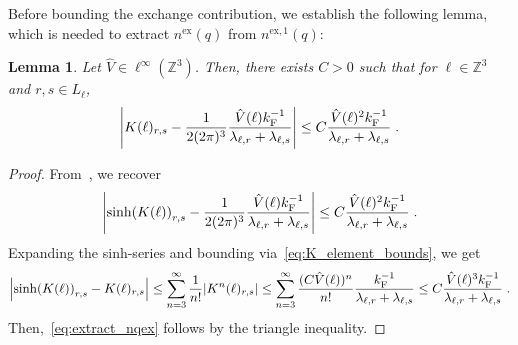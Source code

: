 \documentclass[12pt,a4paper]{article}
\numberwithin{equation}{section}
\newcommand{\1}{\mathbb{I}}
\newcommand{\ex}{\mathrm{ex}}
\newcommand{\F}{\mathrm{F}}
\newcommand{\Zstar}{\mathbb{Z}^3} %
\newcommand{\Z}{\mathbb{Z}}
\theoremstyle{plain}
\newtheorem{lemma}[theorem]{Lemma}
\theoremstyle{definition}
\theoremstyle{remark}
\theoremstyle{plain}
\theoremstyle{definition}
\theoremstyle{remark}
\begin{document}
Before bounding the exchange contribution, we establish the following lemma, which is needed to extract $ n^{\ex}(q) $ from $ n^{\ex,1}(q) $:
\begin{lemma} \label{lem:extract_nqex}
Let $ \hat{V} \in \ell^\infty(\Zstar) $. Then, there exists $ C > 0 $ such that for $ \ell \in \Zstar $ and $ r,s \in L_\ell $,
\begin{equation} \label{eq:extract_nqex}
	\abs{K(\ell)_{r,s} - \frac{1}{2 (2 \pi)^3} \frac{\hat{V}(\ell) k_{\F}^{-1}}{\lambda_{\ell,r} + \lambda_{\ell,s}}}
	\leq C \frac{\hat{V}(\ell)^2 k_{\F}^{-1}}{\lambda_{\ell,r} + \lambda_{\ell,s}} \;.
\end{equation}
\end{lemma}
\begin{proof}
From~\cite[Prop.~3.10]{CHN24}, we recover
\begin{equation}
	\abs{\sinh(K(\ell))_{r,s} - \frac{1}{2 (2 \pi)^3} \frac{\hat{V}(\ell) k_{\F}^{-1}}{\lambda_{\ell,r} + \lambda_{\ell,s}}}
	\leq C \frac{\hat{V}(\ell)^2 k_{\F}^{-1}}{\lambda_{\ell,r} + \lambda_{\ell,s}} \;.
\end{equation}
Expanding the sinh-series and bounding via~\eqref{eq:K_element_bounds}, we get
\begin{equation}
	\abs{\sinh(K(\ell))_{r,s} - K(\ell)_{r,s}}
	\le \sum_{n = 3}^\infty \frac{1}{n!} |K^n(\ell)_{r,s}|
	\le \sum_{n = 3}^\infty \frac{(C \hat{V}(\ell))^n}{n!}
		\frac{k_{\F}^{-1}}{\lambda_{\ell,r} + \lambda_{\ell,s}}
	\le C \frac{\hat{V}(\ell)^3 k_{\F}^{-1}}{\lambda_{\ell,r} + \lambda_{\ell,s}} \;.
\end{equation}
Then,~\eqref{eq:extract_nqex} follows by the triangle inequality.
\end{proof}
\end{document}
